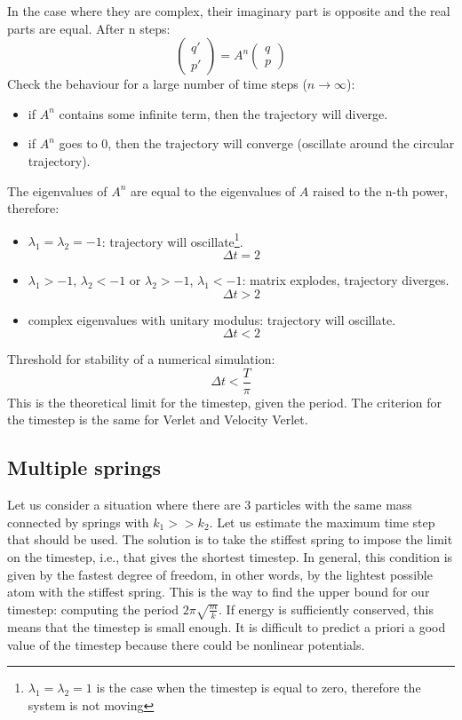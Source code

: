 In the case where they are complex, their imaginary part is opposite and the real parts are equal.
After n steps:
\begin{equation}
    \begin{pmatrix}
      q' \\
      p'
    \end{pmatrix}
    = A^n
    \begin{pmatrix}
      q \\
      p
    \end{pmatrix}
\end{equation}
Check the behaviour for a large number of time steps ($n\xrightarrow{}\infty$):
\begin{itemize}
    \item if $A^n$ contains some infinite term, then the trajectory will diverge.
    \item if $A^n$ goes to 0, then the trajectory will converge (oscillate around the circular trajectory).
\end{itemize}
The eigenvalues of $A^n$ are equal to the eigenvalues of $A$ raised to the n-th power, therefore:
\begin{itemize}
    \item  $\lambda_1=\lambda_2=-1$: trajectory will oscillate\footnote{$\lambda_1=\lambda_2=1$ is the case when the timestep is equal to zero, therefore the system is not moving}. $$\Delta t = 2$$
    \item $\lambda_1> -1$, $\lambda_2< -1$ or $\lambda_2> -1$, $\lambda_1< -1$: matrix explodes, trajectory diverges. $$\Delta t > 2$$
    \item complex eigenvalues with unitary modulus: trajectory will oscillate.  $$\Delta t < 2$$
\end{itemize}
Threshold for stability of a numerical simulation:
\begin{equation}
    \Delta t < \frac{T}{\pi}
\end{equation}
This is the theoretical limit for the timestep, given the period. The criterion for the timestep is the same for Verlet and Velocity Verlet.
\subsection{Multiple springs}
Let us consider a situation where there are 3 particles with the same mass connected by springs with $k_1 >> k_2$. Let us estimate the maximum time step that should be used. The solution is to take the stiffest spring to impose the limit on the timestep, i.e., that gives the shortest timestep.
In general, this condition is given by the fastest degree of freedom, in other words, by the lightest possible atom with the stiffest spring. This is the way to find the upper bound for our timestep:
computing the period $2\pi \sqrt{\frac{m}{k}}$.
If energy is sufficiently conserved, this means that the timestep is small enough. It is difficult to predict a priori a good value of the timestep because there could be nonlinear potentials.

